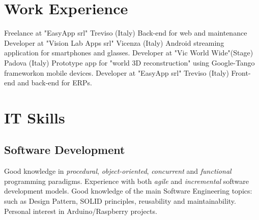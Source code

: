 \documentclass[letterpaper]{twentysecondcv} %
\begin{document}


\section{Work Experience}

\begin{twenty} %
		{Freelance at "EasyApp srl"\footnotemarkA[7]} {Treviso (Italy)}
		{Back-end for web and maintenance}
		{Developer at "Vision Lab Apps srl"\footnotemarkA[4]}	{Vicenza (Italy)}
		{Android streaming application for smartphones and glasses.}
		{Developer at "Vic World Wide"\footnotemarkA[5] (Stage)}	{Padova (Italy)}
		{Prototype app for "world 3D reconstruction" using Google-Tango framework\footnotemarkA[6] on mobile devices.}
		{Developer at "EasyApp srl"\footnotemarkA[7]}	{Treviso (Italy)}
		{Front-end and back-end for ERPs.}
\end{twenty}




\section{IT Skills}

\subsection{Software Development}

Good knowledge in \textit{procedural}, \textit{object-oriented}, \textit{concurrent} and \textit{functional} programming paradigms.\newline
Experience with both \textit{agile} and \textit{incremental} software development models.\newline
Good knowledge of the main Software Engineering topics: such as Design Pattern, SOLID principles, reusability and maintainability.\newline
Personal interest in Arduino/Raspberry projects.
\end{document}
